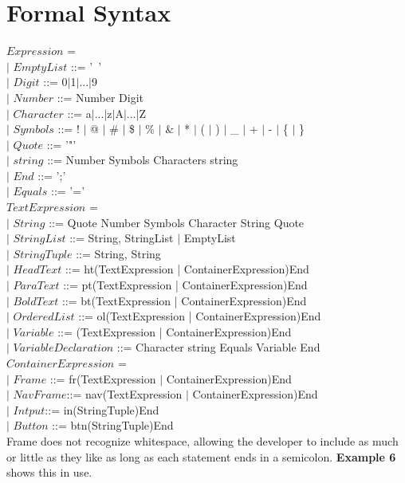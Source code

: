 \documentclass{article}
\begin{document}
\section{Formal Syntax}

\(Expression\) = \\
$|$ \(EmptyList\) ::= '~'\\
$|$ \(Digit\) ::= 0$|$1$|$...$|$9 \\
$|$ \(Number\) ::= Number Digit\\
$|$ \(Character\) ::= a$|$...$|$z$|$A$|$...$|$Z\\
$|$ \(Symbols\) ::= $!$ $|$ @ $|$ \# $|$ \$ $|$ \% $|$ \& $|$ * $|$ ( $|$ ) $|$ \_ $|$ + $|$ - $|$ \{ $|$ \} \\
$|$ \(Quote\) ::= '"' \\
$|$ \(string\) ::= Number Symbols Characters string\\
$|$ \(End\) ::= ';'\\
$|$ \(Equals\) ::= '='\\

\(TextExpression\) = \\
$|$ \(String\) ::= Quote Number Symbols Character String Quote\\
$|$ \(StringList\) ::= String, StringList $|$ EmptyList\\
$|$ \(StringTuple\) ::= String, String\\
$|$ \(HeadText\) ::= ht(TextExpression | ContainerExpression)End\\
$|$ \(ParaText\) ::= pt(TextExpression | ContainerExpression)End\\
$|$ \(BoldText\) ::= bt(TextExpression | ContainerExpression)End\\
$|$ \(OrderedList\) ::= ol(TextExpression | ContainerExpression)End\\
$|$ \(Variable\) ::= (TextExpression | ContainerExpression)End\\
$|$ \(VariableDeclaration\) ::= Character string Equals Variable End\\

\(ContainerExpression\) = \\
$|$ \(Frame\) ::= fr(TextExpression $|$ ContainerExpression)End\\
$|$ \(NavFrame\)::= nav(TextExpression $|$ ContainerExpression)End\\
$|$ \(Intput\)::= in(StringTuple)End\\
$|$ \(Button\) ::= btn(StringTuple)End\\

Frame does not recognize whitespace, allowing the developer to include as much or little as they like as long as each statement ends in a semicolon. \textbf{Example 6} shows this in use.\\
\end{document}

